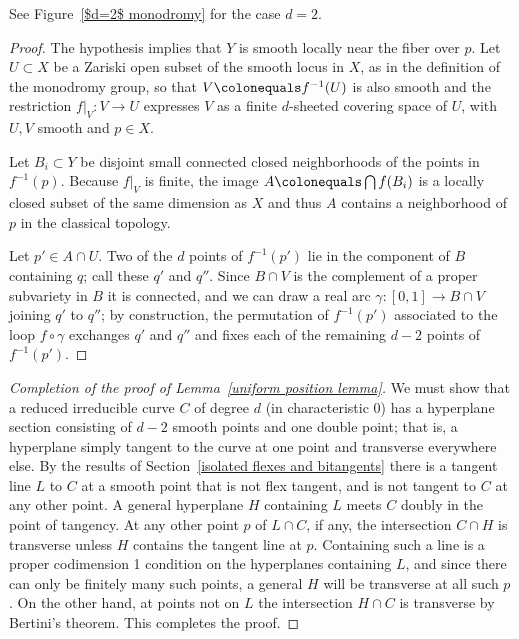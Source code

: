See Figure~\ref{$d=2$ monodromy} for the case $d=2$.

\begin{proof}
The hypothesis implies that $Y$ is smooth
locally near the fiber over $p$. Let $U \subset X$ be a Zariski open
subset of the smooth locus in $X$, as in the definition of the monodromy
group, so that  $V \colonequals  f^{-1}(U)$ is also smooth and the
restriction $f|_V : V \to U$ expresses $V$ as a finite $d$-sheeted
covering space of $U$, with $U,V$ smooth and $p\in X$.

Let $B_i\subset Y$ be disjoint small connected closed neighborhoods of
the points
in $f^{-1}(p)$. Because $f|_V$  is finite, the image $A \colonequals
\bigcap f(B_i)$  is a locally
closed subset of the same dimension as $X$ and thus $A$
 contains a neighborhood
of $p$ in the classical topology.

Let $p' \in A \cap U$. Two of the $d$ points of $f^{-1}(p')$  lie in the
component  of $B$ containing $q$; call these $q'$ and $q''$. Since $B
\cap V$ is the complement of a proper subvariety in $B$ it is connected,
and we can draw a real arc $\gamma : [0,1] \to B \cap V$ joining $q'$
to $q''$; by construction, the permutation of $f^{-1}(p')$ associated
to the loop $f \circ \gamma$  exchanges $q'$ and $q''$ and
fixes
each
of the remaining $d-2$ points of $f^{-1}(p')$.
\end{proof}

\begin{proof}[Completion of the proof of
Lemma~\ref{uniform position lemma}]
We  must show
that
a reduced irreducible curve $C$ of degree $d$
 (in characteristic 0)
 has a hyperplane section consisting of $d-2$ smooth points and one
 double point; that is, a hyperplane simply tangent to the curve at one
 point and transverse everywhere else. By the results of
 Section~\ref{isolated flexes and bitangents} there is a tangent line $L$
 to $C$ at a smooth point that is not flex tangent, and is not tangent
 to $C$ at any other point. A general hyperplane $H$ containing $L$
 meets $C$ doubly in the point of
 tangency. At any other point $p$ of $L\cap C$, if any, the intersection
 $C\cap H$ is transverse
 unless $H$ contains the tangent line at $p$. Containing such a line is
 a  proper codimension 1 condition on
 the hyperplanes containing $L$, and since there can only be finitely
 many such points, a
 general  $H$ will be transverse at all such $p$. On the other hand,
 at points not on $L$
 the intersection $H\cap C$ is transverse by Bertini's theorem. This
 completes the proof.
\end{proof}

